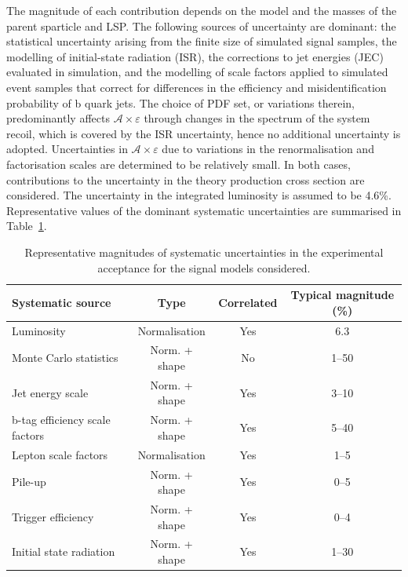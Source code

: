 The magnitude of each contribution depends on the model and the masses
of the parent sparticle and LSP. The following sources of uncertainty
are dominant: the statistical uncertainty arising from the finite size
of simulated signal samples, the modelling of initial-state radiation
(ISR), the corrections to jet energies (JEC) evaluated in simulation,
and the modelling of scale factors applied to simulated event samples
that correct for differences in the efficiency and misidentification
probability of b quark jets. The choice of PDF set, or variations
therein, predominantly affects $\mathcal{A}\times\varepsilon$ through
changes in the \Pt spectrum of the system recoil, which is covered by
the ISR uncertainty, hence no additional uncertainty is
adopted. Uncertainties in $\mathcal{A}\times\varepsilon$ due to
variations in the renormalisation and factorisation scales are
determined to be relatively small. In both cases, contributions to the
uncertainty in the theory production cross section are considered. The
uncertainty in the integrated luminosity is assumed to be
4.6\%. Representative values of the dominant systematic uncertainties
are summarised in Table~\ref{tab:signal_systs}.

\begin{table}[h!]
  \caption{
    Representative magnitudes of systematic uncertainties in the
    experimental acceptance for the signal models considered. } 
  \label{tab:signal_systs}
  \centering
  \footnotesize
  \begin{tabular}{ lccc }
    \hline
    Systematic source\T\B          & Type          & Correlated & Typical magnitude (\%) \\
    \hline
    Luminosity\T                   & Normalisation & Yes        & 6.3                    \\
    Monte Carlo statistics         & Norm. + shape & No         & 1--50                  \\
    Jet energy scale               & Norm. + shape & Yes        & 3--10                  \\
    b-tag efficiency scale factors & Norm. + shape & Yes        & 5--40                  \\
    Lepton scale factors           & Normalisation & Yes        & 1--5                   \\
    Pile-up                        & Norm. + shape & Yes        & 0--5                   \\
    Trigger efficiency             & Norm. + shape & Yes        & 0--4                   \\
    Initial state radiation\B      & Norm. + shape & Yes        & 1--30                  \\
    \hline
  \end{tabular}
\end{table}
  
